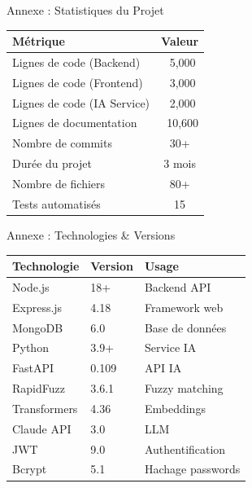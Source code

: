 \documentclass[aspectratio=169]{beamer}
\begin{document}
\begin{frame}{Annexe : Statistiques du Projet}
    \begin{table}
        \small
        \begin{tabular}{lc}
            \toprule
            \textbf{Métrique} & \textbf{Valeur} \\
            \midrule
            Lignes de code (Backend) & ~5,000 \\
            Lignes de code (Frontend) & ~3,000 \\
            Lignes de code (IA Service) & ~2,000 \\
            Lignes de documentation & ~10,600 \\
            Nombre de commits & 30+ \\
            Durée du projet & 3 mois \\
            Nombre de fichiers & 80+ \\
            Tests automatisés & 15 \\
            \bottomrule
        \end{tabular}
    \end{table}
\end{frame}

\begin{frame}{Annexe : Technologies \& Versions}
    \begin{table}
        \footnotesize
        \begin{tabular}{lll}
            \toprule
            \textbf{Technologie} & \textbf{Version} & \textbf{Usage} \\
            \midrule
            Node.js & 18+ & Backend API \\
            Express.js & 4.18 & Framework web \\
            MongoDB & 6.0 & Base de données \\
            Python & 3.9+ & Service IA \\
            FastAPI & 0.109 & API IA \\
            RapidFuzz & 3.6.1 & Fuzzy matching \\
            Transformers & 4.36 & Embeddings \\
            Claude API & 3.0 & LLM \\
            JWT & 9.0 & Authentification \\
            Bcrypt & 5.1 & Hachage passwords \\
            \bottomrule
        \end{tabular}
    \end{table}
\end{frame}
\end{document}
